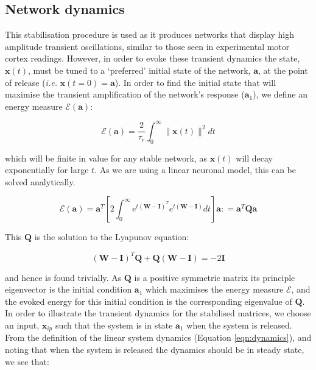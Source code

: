 \documentclass[12pt, a4paper]{article}
\newcommand{\defeq}{\mathrel{\mathop:}=}
\begin{document}
\FloatBarrier
\subsection{Network dynamics}
This stabilisation procedure is used as it produces networks that display high amplitude transient oscillations, similar to those seen in experimental motor cortex readings\cite{HennequinSubmitted}.  However, in order to evoke these transient dynamics the state, $\mathbf{x}(t)$, must be tuned to a `preferred' initial state of the network, $\mathbf{a}$, at the point of release (\emph{i.e.} $\mathbf{x}(t = 0) = \mathbf{a}$).  In order to find the initial state that will maximise the transient amplification of the network's response ($\mathbf{a}_1$), we define an energy measure $\mathcal{E}(\mathbf{a})$: 

    \begin{equation}    \mathcal{E}(\mathbf{a}) = \frac{2}{\tau_r} \int_0^\infty \|\mathbf{x}(t)\|^2 dt     \end{equation}
    
\noindent which will be finite in value for any stable network, as $\mathbf{x}(t)$ will decay exponentially for large $t$.  As we are using a linear neuronal model, this can be solved analytically. 

    \begin{equation}     \mathcal{E}(\mathbf{a}) = \mathbf{a}^T \left[ 2\int_0^\infty e^{t(\mathbf{W}-\mathbf{I})^T} e^{t(\mathbf{W}-\mathbf{I})} dt \right] \mathbf{a}  \defeq \mathbf{a}^T\mathbf{Q}\mathbf{a}        \end{equation}

This $\mathbf{Q}$ is the solution to the Lyapunov equation:

    \begin{equation}    (\mathbf{W} - \mathbf{I})^T \mathbf{Q} + \mathbf{Q}(\mathbf{W} - \mathbf{I}) = -2 \mathbf{I}        \end{equation}
    
\noindent and hence is found trivially.  As $\mathbf{Q}$ is a positive symmetric matrix its principle eigenvector is the initial condition $\mathbf{a}_1$ which maximises the energy measure $\mathcal{E}$, and the evoked energy for this initial condition is the corresponding eigenvalue of $\mathbf{Q}$. In order to illustrate the transient dynamics for the stabilised matrices, we choose an input, $\mathbf{x}_{ip}$ such that the system is in state $\mathbf{a}_1$ when the system is released.  From the definition of the linear system dynamics (Equation \ref{eqn:dynamics}), and noting that when the system is released the dynamics should be in steady state, we see that:
\end{document}
